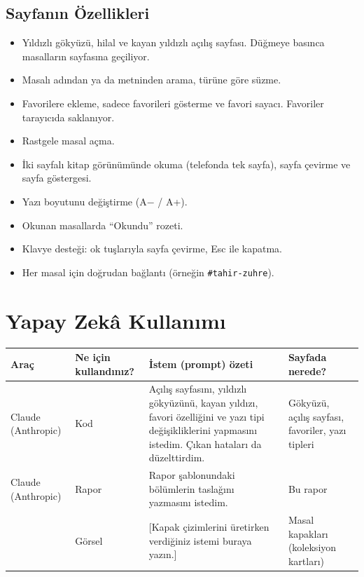 \documentclass[12pt,a4paper]{article}
\begin{document}
\subsection{Sayfanın Özellikleri}
\begin{itemize}
  \item Yıldızlı gökyüzü, hilal ve kayan yıldızlı açılış sayfası. Düğmeye basınca masalların sayfasına geçiliyor.
  \item Masalı adından ya da metninden arama, türüne göre süzme.
  \item Favorilere ekleme, sadece favorileri gösterme ve favori sayacı. Favoriler tarayıcıda saklanıyor.
  \item Rastgele masal açma.
  \item İki sayfalı kitap görünümünde okuma (telefonda tek sayfa), sayfa çevirme ve sayfa göstergesi.
  \item Yazı boyutunu değiştirme (A$-$ / A+).
  \item Okunan masallarda ``Okundu'' rozeti.
  \item Klavye desteği: ok tuşlarıyla sayfa çevirme, Esc ile kapatma.
  \item Her masal için doğrudan bağlantı (örneğin \texttt{\#tahir-zuhre}).
\end{itemize}

\section{Yapay Zekâ Kullanımı}
\begin{longtable}{@{}p{2.6cm}p{3.6cm}p{4.2cm}p{3.4cm}@{}}
\toprule
\textbf{Araç} & \textbf{Ne için kullandınız?} & \textbf{İstem (prompt) özeti} & \textbf{Sayfada nerede?} \\
\midrule
\endhead
Claude (Anthropic) & Kod & Açılış sayfasını, yıldızlı gökyüzünü, kayan yıldızı, favori özelliğini ve yazı tipi değişikliklerini yapmasını istedim. Çıkan hataları da düzelttirdim. & Gökyüzü, açılış sayfası, favoriler, yazı tipleri \\
Claude (Anthropic) & Rapor & Rapor şablonundaki bölümlerin taslağını yazmasını istedim. & Bu rapor \\
 & Görsel & [Kapak çizimlerini üretirken verdiğiniz istemi buraya yazın.] & Masal kapakları (koleksiyon kartları) \\
\bottomrule
\end{longtable}
\end{document}
